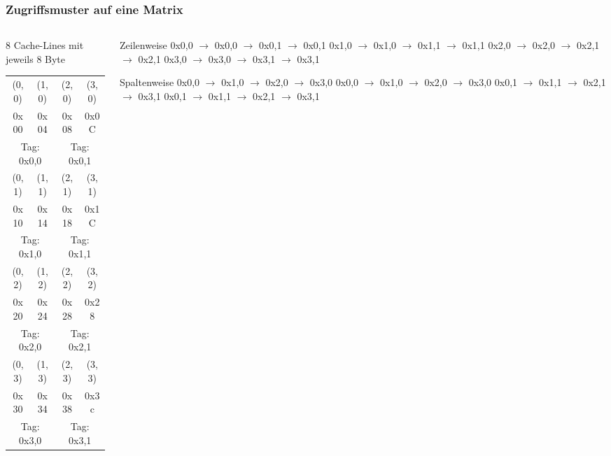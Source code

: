 \documentclass[xcolor=pdftex,dvipsnames,table]{beamer}
\begin{document}
\begin{frame}
	\frametitle{Zugriffsmuster auf eine Matrix}
	\begin{columns}
		\begin{column}{0.5\textwidth}
			8 Cache-Lines mit jeweils 8 Byte\\
			\begin{tabular}{|c|c|c|c|}
				\hline
				(0, 0) & (1, 0) & (2, 0) & (3, 0) \\
				0x00 & 0x04 & 0x08 & 0x0C \\
				\hline
				\multicolumn{2}{|c|}{Tag: 0x0,0} &
				\multicolumn{2}{c|}{Tag: 0x0,1} \\
				\hline
				\hline
				(0, 1) & (1, 1) & (2, 1) & (3, 1) \\
				0x10 & 0x14 & 0x18 & 0x1C \\
				\hline
				\multicolumn{2}{|c|}{Tag: 0x1,0} &
				\multicolumn{2}{c|}{Tag: 0x1,1} \\
				\hline
				\hline
				(0, 2) & (1, 2) & (2, 2) & (3, 2) \\
				0x20 & 0x24 & 0x28 & 0x28 \\
				\hline
				\multicolumn{2}{|c|}{Tag: 0x2,0} &
				\multicolumn{2}{c|}{Tag: 0x2,1} \\
				\hline
				\hline
				(0, 3) & (1, 3) & (2, 3) & (3, 3) \\
				0x30 & 0x34 & 0x38 & 0x3c \\
				\hline
				\multicolumn{2}{|c|}{Tag: 0x3,0} &
				\multicolumn{2}{c|}{Tag: 0x3,1} \\
				\hline
			\end{tabular}
		\end{column}
		\begin{column}{0.5\textwidth}
			\begin{block}{Zeilenweise}
				0x0,0 $\rightarrow$ 0x0,0 $\rightarrow$ 0x0,1 $\rightarrow$ 0x0,1 0x1,0 $\rightarrow$ 0x1,0 $\rightarrow$ 0x1,1 $\rightarrow$ 0x1,1  0x2,0 $\rightarrow$ 0x2,0 $\rightarrow$ 0x2,1 $\rightarrow$ 0x2,1  0x3,0 $\rightarrow$ 0x3,0 $\rightarrow$ 0x3,1 $\rightarrow$ 0x3,1
			\end{block}
			\begin{block}{Spaltenweise}
				0x0,0 $\rightarrow$ 0x1,0 $\rightarrow$ 0x2,0 $\rightarrow$ 0x3,0 0x0,0 $\rightarrow$ 0x1,0 $\rightarrow$ 0x2,0 $\rightarrow$ 0x3,0  0x0,1 $\rightarrow$ 0x1,1 $\rightarrow$ 0x2,1 $\rightarrow$ 0x3,1  0x0,1 $\rightarrow$ 0x1,1 $\rightarrow$ 0x2,1 $\rightarrow$ 0x3,1
			\end{block}
		\end{column}
	\end{columns}


	
\end{frame}
\end{document}
